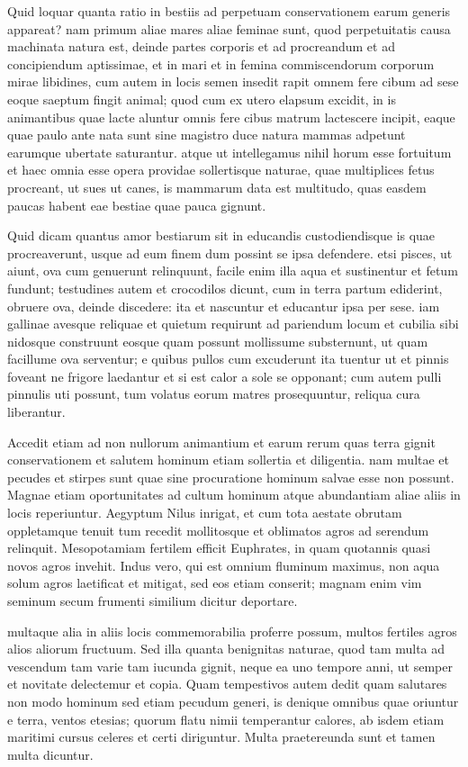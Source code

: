  Quid loquar quanta ratio in bestiis ad perpetuam conservationem earum generis appareat? nam primum aliae mares aliae feminae sunt, quod perpetuitatis causa machinata natura est, deinde partes corporis et ad procreandum et ad concipiendum aptissimae, et in mari et in femina commiscendorum corporum mirae libidines, cum autem in locis semen insedit rapit omnem fere cibum ad sese eoque saeptum fingit animal; quod cum ex utero elapsum excidit, in is animantibus quae lacte aluntur omnis fere cibus matrum lactescere incipit, eaque quae paulo ante nata sunt sine magistro duce natura mammas adpetunt earumque ubertate saturantur. atque ut intellegamus nihil horum esse fortuitum et haec omnia esse opera providae sollertisque naturae, quae multiplices fetus procreant, ut sues ut canes, is mammarum data est multitudo, quas easdem paucas habent eae bestiae quae pauca gignunt.

 Quid dicam quantus amor bestiarum sit in educandis custodiendisque is quae procreaverunt, usque ad eum finem dum possint se ipsa defendere. etsi pisces, ut aiunt, ova cum genuerunt relinquunt, facile enim illa aqua et sustinentur et fetum fundunt; testudines autem et crocodilos dicunt, cum in terra partum ediderint, obruere ova, deinde discedere: ita et nascuntur et educantur ipsa per sese. iam gallinae avesque reliquae et quietum requirunt ad pariendum locum et cubilia sibi nidosque construunt eosque quam possunt mollissume substernunt, ut quam facillume ova serventur; e quibus pullos cum excuderunt ita tuentur ut et pinnis foveant ne frigore laedantur et si est calor a sole se opponant; cum autem pulli pinnulis uti possunt, tum volatus eorum matres prosequuntur, reliqua cura liberantur.

 Accedit etiam ad non nullorum animantium et earum rerum quas terra gignit conservationem et salutem hominum etiam sollertia et diligentia. nam multae et pecudes et stirpes sunt quae sine procuratione hominum salvae esse non possunt. Magnae etiam oportunitates ad cultum hominum atque abundantiam aliae aliis in locis reperiuntur. Aegyptum Nilus inrigat, et cum tota aestate obrutam oppletamque tenuit tum recedit mollitosque et oblimatos agros ad serendum relinquit. Mesopotamiam fertilem efficit Euphrates, in quam quotannis quasi novos agros invehit. Indus vero, qui est omnium fluminum maximus, non aqua solum agros laetificat et mitigat, sed eos etiam conserit; magnam enim vim seminum secum frumenti similium dicitur deportare.

 multaque alia in aliis locis commemorabilia proferre possum, multos fertiles agros alios aliorum fructuum. Sed illa quanta benignitas naturae, quod tam multa ad vescendum tam varie tam iucunda gignit, neque ea uno tempore anni, ut semper et novitate delectemur et copia. Quam tempestivos autem dedit quam salutares non modo hominum sed etiam pecudum generi, is denique omnibus quae oriuntur e terra, ventos etesias; quorum flatu nimii temperantur calores, ab isdem etiam maritimi cursus celeres et certi diriguntur. Multa praetereunda sunt et tamen multa dicuntur.

